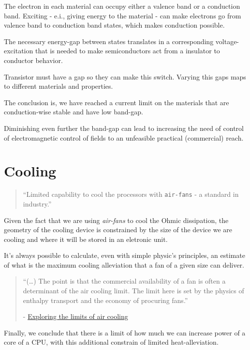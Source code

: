 \documentclass[12pt]{article}
\begin{document}
The electron in each material can occupy either a valence band or a conduction
band. Exciting - e.i., giving energy to the material - can make electrons go
from valence band to conduction band states, which makes conduction possible.

The necessary energy-gap between states translates in a corresponding
voltage-excitation that is needed to make semiconductors act from a insulator
to conductor behavior.

Transistor must have a gap so they can make this switch. Varying this gaps maps
to different materials and properties.

The conclusion is, we have reached a current limit on the materials that are
conduction-wise stable and have low band-gap.

Diminishing even further the band-gap can lead to increasing the need of control
of electromagnetic control of fields to an unfeasible practical (commercial)
reach.

\clearpage
\section{Cooling}
\label{sec:org0a389d7}
\begin{quote}
  ``Limited capability to cool the processors with \texttt{air-fans} - a standard in industry.''
\end{quote}

Given the fact that we are using \emph{air-fans} to cool the Ohmic dissipation, the
geometry of the cooling device is constrained by the size of the device we are
cooling and where it will be stored in an eletronic unit.

It's always possible to calculate, even with simple physic's principles, an
estimate of what is the maximum cooling alleviation that a fan of a given size
can deliver.

\begin{quote}
  ``(\ldots{}) The point is that the commercial availability of a
  fan is often a determinant of the air cooling limit. The limit here is set
  by the physics of enthalpy transport and the economy of procuring fans.''

  - \href{https://www.electronics-cooling.com/2006/08/exploring-the-limits-of-air-cooling/}{Exploring the limits of air cooling}
\end{quote}

Finally, we conclude that there is a limit of how much we can increase power of
a core of a CPU, with this additional constrain of limited heat-alleviation.
\end{document}
